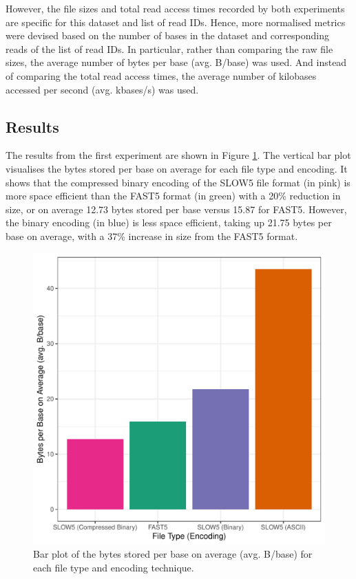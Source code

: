 However, the file sizes and total read access times recorded by both experiments are specific for this dataset and list of read IDs. Hence, more normalised metrics were devised based on the number of bases in the dataset and corresponding reads of the list of read IDs. In particular, rather than comparing the raw file sizes, the average number of bytes per base (avg. B/base) was used. And instead of comparing the total read access times, the average number of kilobases accessed per second (avg. kbases/s) was used.

\subsection{Results}
\label{sec:experi:results}

The results from the first experiment are shown in Figure \ref{fig:size}. The vertical bar plot visualises the bytes stored per base on average for each file type and encoding. It shows that the compressed binary encoding of the SLOW5 file format (in pink) is more space efficient than the FAST5 format (in green) with a 20\% reduction in size, or on average 12.73 bytes stored per base versus 15.87 for FAST5. However, the binary encoding (in blue) is less space efficient, taking up 21.75 bytes per base on average, with a 37\% increase in size from the FAST5 format.

\begin{figure}[h]
    \includegraphics[width=\linewidth]{../../../plot/gpgpu_size.pdf}
    \caption[Bar plot of the bytes stored per base on average for each file type and encoding technique.]{Bar plot of the bytes stored per base on average (avg. B/base) for each file type and encoding technique.}
    \label{fig:size}
\end{figure}

